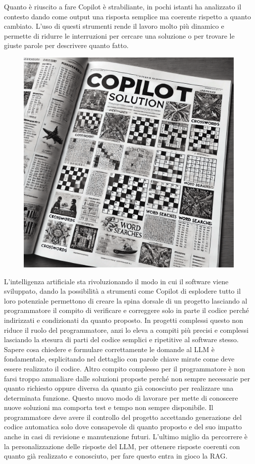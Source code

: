 \documentclass[12pt,a4paper,openright,twoside]{book}
\begin{document}
Quanto è riuscito a fare Copilot è strabiliante, in pochi istanti ha analizzato il contesto dando come output una risposta semplice ma coerente rispetto a quanto cambiato.
L'uso di questi strumenti rende il lavoro molto più dinamico e permette di ridurre le interruzioni per cercare una soluzione o per trovare le giuste parole per descrivere
quanto fatto.
\begin{figure}[h]
    \centering
    \includegraphics[width=0.5\linewidth]{figures/copilotsolutionSettimanaEnigmistica.png}
    \label{fig:enter-label}
\end{figure}
\newline
L'intelligenza artificiale sta rivoluzionando il modo in cui il software viene sviluppato, dando la possibilità a strumenti come Copilot di esplodere tutto il loro potenziale permettono di creare la spina dorsale di un progetto lasciando al programmatore il compito di verificare e correggere solo in parte il codice perché indirizzati e condizionati da quanto proposto. 
In progetti complessi questo non riduce il ruolo del programmatore, anzi lo eleva a compiti più precisi e complessi lasciando la stesura di parti del codice semplici e ripetitive al software stesso.
Sapere cosa chiedere e formulare correttamente le domande al LLM è fondamentale, esplicitando nel dettaglio con parole chiave mirate come deve essere realizzato il codice.
Altro compito complesso per il programmatore è non farsi troppo ammaliare dalle soluzioni proposte perché non sempre necessarie per quanto richiesto oppure diversa da quanto già conosciuto per realizzare una determinata funzione.
Questo nuovo modo di lavorare per mette di conoscere nuove soluzioni ma comporta test e tempo non sempre disponibile.
Il programmatore deve avere il controllo del progetto accettando generazione del codice automatica solo dove consapevole di quanto proposto e del suo impatto anche in casi di revisione e manutenzione futuri.
L'ultimo miglio da percorrere è la personalizzazione delle risposte del LLM, per ottenere risposte coerenti con quanto già realizzato e conosciuto, per fare questo entra in gioco la RAG.
\end{document}
